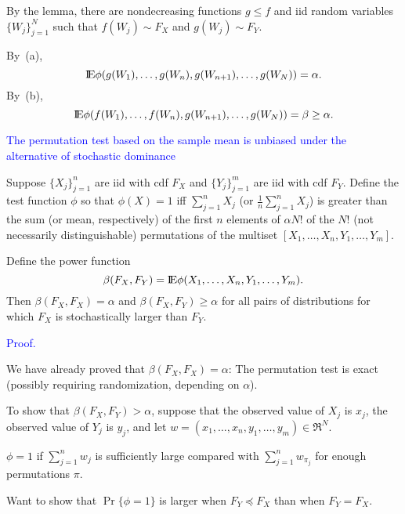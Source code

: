 \documentclass[landscape]{slides}
\newcommand{\EE}{\hbox{I\kern-.1667em\hbox{E}}}
\newcommand{\beq}{\begin{equation}}
\newcommand{\eeq}{\end{equation}}
\begin{document}
\begin{slide}
\begin{slide}
By the lemma, there are nondecreasing functions $g \le f$ and
iid random variables $\{W_j\}_{j=1}^N$ such that $f(W_j) \sim F_X$
and $g(W_j) \sim F_Y$.

By~(a),
\beq
    \EE \phi(g(W_1), \ldots, g(W_n), g(W_{n+1}), \ldots, g(W_N)) = \alpha.
\eeq
By~(b),
\beq
    \EE \phi(f(W_1), \ldots, f(W_n), g(W_{n+1}), \ldots, g(W_N)) = \beta \ge \alpha.
\eeq

\end{slide}


\begin{slide}
{\textcolor{blue}{The permutation test based on the sample mean is unbiased
under the alternative of stochastic dominance}}

Suppose $\{X_j\}_{j=1}^n$ are iid with cdf $F_X$ and $\{Y_j\}_{j=1}^m$ are iid with cdf $F_Y$.
Define the test function $\phi$ so that $ \phi(X) = 1$ iff  $\sum_{j=1}^n X_j$ (or 
$\frac{1}{n} \sum_{j=1}^n X_j$) is greater than
the sum (or mean, respectively) of the first $n$ elements of $\alpha N!$ of the $N!$ (not necessarily distinguishable)
permutations of the multiset $[X_1, \ldots, X_n, Y_1, \ldots, Y_m]$.

Define the power function 
\beq
    \beta(F_X, F_Y) = \EE \phi(X_1, \ldots, X_n, Y_1, \ldots, Y_m).
\eeq
Then $\beta(F_X, F_X) = \alpha$ and $\beta(F_X, F_Y) \ge \alpha$ for all
pairs of distributions for which $F_X$ is stochastically larger than $F_Y$.

\end{slide}


\begin{slide}
{\textcolor{blue}{Proof.}}

We have already proved that $\beta(F_X, F_X) = \alpha$: The permutation test
is exact (possibly requiring randomization, depending on $\alpha$).

To show that $\beta(F_X, F_Y) > \alpha$, suppose that the observed value of 
$X_j$ is $x_j$, the observed value of $Y_j$ is $y_j$, and let 
$w = (x_1, \ldots, x_n, y_1, \ldots, y_m) \in \Re^N$.

$\phi = 1$ if $\sum_{j=1}^n w_j$ is sufficiently large compared with
$\sum_{j=1}^n w_{\pi_j}$ for enough permutations $\pi$.

Want to show that $\Pr \{ \phi = 1 \} $ is larger when $F_Y \preceq F_X$ than
when $F_Y = F_X$.


\end{slide}
\end{slide}
\end{document}
